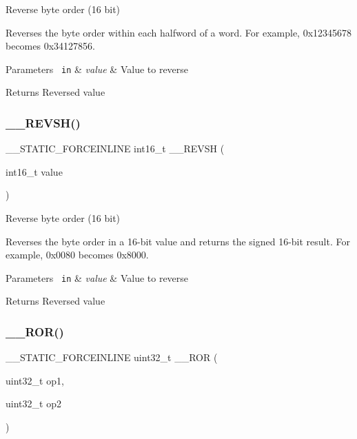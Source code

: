 Reverse byte order (16 bit) 

Reverses the byte order within each halfword of a word. For example, 0x12345678 becomes 0x34127856. 
\begin{DoxyParams}[1]{Parameters}
\mbox{\texttt{ in}}  & {\em value} & Value to reverse \\
\hline
\end{DoxyParams}
\begin{DoxyReturn}{Returns}
Reversed value 
\end{DoxyReturn}
\mbox{\label{group___c_m_s_i_s___core___instruction_interface_gacb695341318226a5f69ed508166622ac}} 
\subsubsection{\texorpdfstring{\_\_REVSH()}{\_\_REVSH()}}
{\footnotesize\ttfamily \+\_\+\+\_\+\+S\+T\+A\+T\+I\+C\+\_\+\+F\+O\+R\+C\+E\+I\+N\+L\+I\+NE int16\+\_\+t \+\_\+\+\_\+\+R\+E\+V\+SH (\begin{DoxyParamCaption}\item[{int16\+\_\+t}]{value }\end{DoxyParamCaption})}



Reverse byte order (16 bit) 

Reverses the byte order in a 16-\/bit value and returns the signed 16-\/bit result. For example, 0x0080 becomes 0x8000. 
\begin{DoxyParams}[1]{Parameters}
\mbox{\texttt{ in}}  & {\em value} & Value to reverse \\
\hline
\end{DoxyParams}
\begin{DoxyReturn}{Returns}
Reversed value 
\end{DoxyReturn}
\mbox{\label{group___c_m_s_i_s___core___instruction_interface_gab16acb6456176f1e87a4f2724c2b6028}} 
\subsubsection{\texorpdfstring{\_\_ROR()}{\_\_ROR()}}
{\footnotesize\ttfamily \+\_\+\+\_\+\+S\+T\+A\+T\+I\+C\+\_\+\+F\+O\+R\+C\+E\+I\+N\+L\+I\+NE uint32\+\_\+t \+\_\+\+\_\+\+R\+OR (\begin{DoxyParamCaption}\item[{uint32\+\_\+t}]{op1,  }\item[{uint32\+\_\+t}]{op2 }\end{DoxyParamCaption})}



